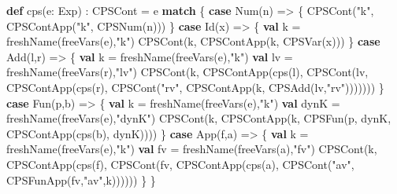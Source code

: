 \documentclass[]{article}
\newenvironment{Shaded}{}{}
\newcommand{\FunctionTok}[1]{\textcolor[rgb]{0.02,0.16,0.49}{#1}}
\newcommand{\KeywordTok}[1]{\textcolor[rgb]{0.00,0.44,0.13}{\textbf{#1}}}
\newcommand{\NormalTok}[1]{#1}
\newcommand{\StringTok}[1]{\textcolor[rgb]{0.25,0.44,0.63}{#1}}
\begin{document}
\begin{Shaded}
\begin{Highlighting}[]
\KeywordTok{def} \FunctionTok{cps}\NormalTok{(e: Exp) : CPSCont = e }\KeywordTok{match}\NormalTok{ \{}
  \KeywordTok{case} \FunctionTok{Num}\NormalTok{(n) =\textgreater{} \{}
    \FunctionTok{CPSCont}\NormalTok{(}\StringTok{"k"}\NormalTok{, }\FunctionTok{CPSContApp}\NormalTok{(}\StringTok{"k"}\NormalTok{, }\FunctionTok{CPSNum}\NormalTok{(n)))}
\NormalTok{  \}}
  \KeywordTok{case} \FunctionTok{Id}\NormalTok{(x) =\textgreater{} \{}
    \KeywordTok{val}\NormalTok{ k = }\FunctionTok{freshName}\NormalTok{(}\FunctionTok{freeVars}\NormalTok{(e),}\StringTok{"k"}\NormalTok{)}
    \FunctionTok{CPSCont}\NormalTok{(k, }\FunctionTok{CPSContApp}\NormalTok{(k, }\FunctionTok{CPSVar}\NormalTok{(x)))}
\NormalTok{  \}}
  \KeywordTok{case} \FunctionTok{Add}\NormalTok{(l,r) =\textgreater{} \{}
    \KeywordTok{val}\NormalTok{ k = }\FunctionTok{freshName}\NormalTok{(}\FunctionTok{freeVars}\NormalTok{(e),}\StringTok{"k"}\NormalTok{)}
    \KeywordTok{val}\NormalTok{ lv = }\FunctionTok{freshName}\NormalTok{(}\FunctionTok{freeVars}\NormalTok{(r),}\StringTok{"lv"}\NormalTok{)}
    \FunctionTok{CPSCont}\NormalTok{(k, }\FunctionTok{CPSContApp}\NormalTok{(}\FunctionTok{cps}\NormalTok{(l), }\FunctionTok{CPSCont}\NormalTok{(lv, }
      \FunctionTok{CPSContApp}\NormalTok{(}\FunctionTok{cps}\NormalTok{(r), }\FunctionTok{CPSCont}\NormalTok{(}\StringTok{"rv"}\NormalTok{, }
        \FunctionTok{CPSContApp}\NormalTok{(k, }\FunctionTok{CPSAdd}\NormalTok{(lv,}\StringTok{"rv"}\NormalTok{)))))))}
\NormalTok{  \}}
  \KeywordTok{case} \FunctionTok{Fun}\NormalTok{(p,b) =\textgreater{} \{}
    \KeywordTok{val}\NormalTok{ k = }\FunctionTok{freshName}\NormalTok{(}\FunctionTok{freeVars}\NormalTok{(e),}\StringTok{"k"}\NormalTok{)}
    \KeywordTok{val}\NormalTok{ dynK = }\FunctionTok{freshName}\NormalTok{(}\FunctionTok{freeVars}\NormalTok{(e),}\StringTok{"dynK"}\NormalTok{)}
    \FunctionTok{CPSCont}\NormalTok{(k, }\FunctionTok{CPSContApp}\NormalTok{(k, }\FunctionTok{CPSFun}\NormalTok{(p, dynK, }\FunctionTok{CPSContApp}\NormalTok{(}\FunctionTok{cps}\NormalTok{(b), dynK))))}
\NormalTok{  \}}
  \KeywordTok{case} \FunctionTok{App}\NormalTok{(f,a) =\textgreater{} \{}
    \KeywordTok{val}\NormalTok{ k = }\FunctionTok{freshName}\NormalTok{(}\FunctionTok{freeVars}\NormalTok{(e),}\StringTok{"k"}\NormalTok{)}
    \KeywordTok{val}\NormalTok{ fv = }\FunctionTok{freshName}\NormalTok{(}\FunctionTok{freeVars}\NormalTok{(a),}\StringTok{"fv"}\NormalTok{)}
    \FunctionTok{CPSCont}\NormalTok{(k, }\FunctionTok{CPSContApp}\NormalTok{(}\FunctionTok{cps}\NormalTok{(f), }\FunctionTok{CPSCont}\NormalTok{(fv,}
      \FunctionTok{CPSContApp}\NormalTok{(}\FunctionTok{cps}\NormalTok{(a), }\FunctionTok{CPSCont}\NormalTok{(}\StringTok{"av"}\NormalTok{,}
        \FunctionTok{CPSFunApp}\NormalTok{(fv,}\StringTok{"av"}\NormalTok{,k))))))}
\NormalTok{  \}}
\NormalTok{\}}
\end{Highlighting}
\end{Shaded}
\end{document}
